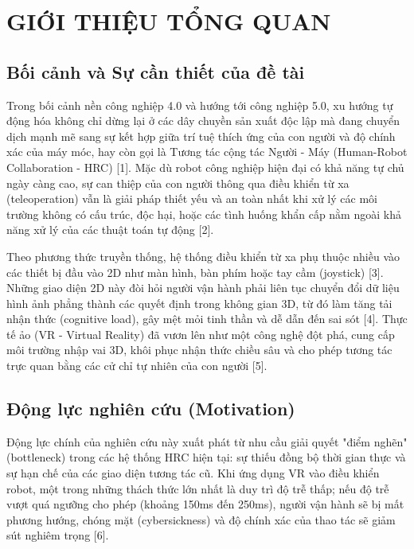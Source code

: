 \chapter{GIỚI THIỆU TỔNG QUAN}
\label{chap:intro}

\section{Bối cảnh và Sự cần thiết của đề tài}
Trong bối cảnh nền công nghiệp 4.0 và hướng tới công nghiệp 5.0, xu hướng tự động hóa không chỉ dừng lại ở các dây chuyền sản xuất độc lập mà đang chuyển dịch mạnh mẽ sang sự kết hợp giữa trí tuệ thích ứng của con người và độ chính xác của máy móc, hay còn gọi là Tương tác cộng tác Người - Máy (Human-Robot Collaboration - HRC) \cite{kawshan2026digital} [1]. Mặc dù robot công nghiệp hiện đại có khả năng tự chủ ngày càng cao, sự can thiệp của con người thông qua điều khiển từ xa (teleoperation) vẫn là giải pháp thiết yếu và an toàn nhất khi xử lý các môi trường không có cấu trúc, độc hại, hoặc các tình huống khẩn cấp nằm ngoài khả năng xử lý của các thuật toán tự động \cite{torrejon2026teleoperation} [2]. 

Theo phương thức truyền thống, hệ thống điều khiển từ xa phụ thuộc nhiều vào các thiết bị đầu vào 2D như màn hình, bàn phím hoặc tay cầm (joystick) \cite{hetrick2020comparing} [3]. Những giao diện 2D này đòi hỏi người vận hành phải liên tục chuyển đổi dữ liệu hình ảnh phẳng thành các quyết định trong không gian 3D, từ đó làm tăng tải nhận thức (cognitive load), gây mệt mỏi tinh thần và dễ dẫn đến sai sót \cite{chen2023comparing} [4]. Thực tế ảo (VR - Virtual Reality) đã vươn lên như một công nghệ đột phá, cung cấp môi trường nhập vai 3D, khôi phục nhận thức chiều sâu và cho phép tương tác trực quan bằng các cử chỉ tự nhiên của con người \cite{zhang2023research} [5].

\section{Động lực nghiên cứu (Motivation)}
Động lực chính của nghiên cứu này xuất phát từ nhu cầu giải quyết "điểm nghẽn" (bottleneck) trong các hệ thống HRC hiện tại: sự thiếu đồng bộ thời gian thực và sự hạn chế của các giao diện tương tác cũ. Khi ứng dụng VR vào điều khiển robot, một trong những thách thức lớn nhất là duy trì độ trễ thấp; nếu độ trễ vượt quá ngưỡng cho phép (khoảng 150ms đến 250ms), người vận hành sẽ bị mất phương hướng, chóng mặt (cybersickness) và độ chính xác của thao tác sẽ giảm sút nghiêm trọng \cite{torrejon2026teleoperation} [6]. 

